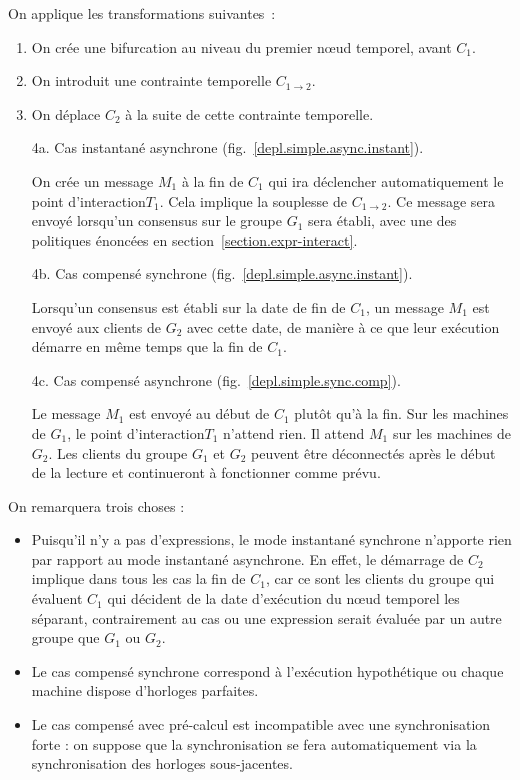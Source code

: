 \documentclass[10pt]{article}
\newcommand\timenode{nœud temporel\xspace}
\newcommand\trigger{point d'interaction\xspace}
\begin{document}

On applique les transformations suivantes~: 
\begin{enumerate}
    \item On crée une bifurcation au niveau du premier \timenode, avant $C_1$.
    \item On introduit une contrainte temporelle $C_{1\rightarrow2}$.
    \item On déplace $C_2$ à la suite de cette contrainte temporelle.
    \item[4a.] Cas instantané asynchrone (fig.~\ref{depl.simple.async.instant}).
    
    On crée un message $M_1$ à la fin de $C_1$ qui ira déclencher automatiquement le \trigger $T_1$. 
    Cela implique la souplesse de $C_{1\rightarrow2}$.
    Ce message sera envoyé lorsqu'un consensus sur le groupe $G_1$ sera établi, avec une des politiques énoncées en section~\ref{section.expr-interact}.
    \item[4b.] Cas compensé synchrone (fig.~\ref{depl.simple.async.instant}).
    
    Lorsqu'un consensus est établi sur la date de fin de $C_1$, un message $M_1$ est envoyé aux clients de $G_2$ avec cette date, de manière à ce que leur exécution démarre en même temps que la fin de $C_1$.
    \item[4c.] Cas compensé asynchrone (fig.~\ref{depl.simple.sync.comp}). 
    
    Le message $M_1$ est envoyé au début de $C_1$ plutôt qu'à la fin.
    Sur les machines de $G_1$, le \trigger $T_1$ n'attend rien. Il attend $M_1$ sur les machines de $G_2$.
    Les clients du groupe $G_1$ et $G_2$ peuvent être déconnectés après le début de la lecture et continueront à fonctionner comme prévu.
\end{enumerate}

On remarquera trois choses : 
\begin{itemize}
    \item Puisqu'il n'y a pas d'expressions, le mode instantané synchrone n'apporte rien par rapport au mode instantané asynchrone.
    En effet, le démarrage de $C_2$ implique dans tous les cas la fin de $C_1$, car ce sont les clients du groupe qui évaluent $C_1$ qui décident de la date d'exécution du nœud temporel les séparant, contrairement au cas ou une expression serait évaluée par un autre groupe que $G_1$ ou $G_2$.
    \item Le cas compensé synchrone correspond à l'exécution hypothétique ou chaque machine dispose d'horloges parfaites.
    \item Le cas compensé avec pré-calcul est incompatible avec une synchronisation forte : on suppose que la synchronisation se fera automatiquement via la synchronisation des horloges sous-jacentes.
\end{itemize}
\end{document}
